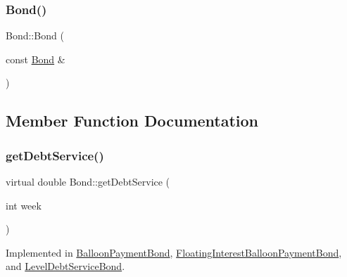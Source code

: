 \mbox{\label{classBond_acaa8874ed5e81057eeb7dc55fb6b5373_acaa8874ed5e81057eeb7dc55fb6b5373}} 
\subsubsection{\texorpdfstring{Bond()}{Bond()}\hspace{0.1cm}{\footnotesize\ttfamily [4/4]}}
{\footnotesize\ttfamily Bond\+::\+Bond (\begin{DoxyParamCaption}\item[{const \mbox{\hyperlink{classBond}{Bond}} \&}]{ }\end{DoxyParamCaption})\hspace{0.3cm}{\ttfamily [default]}}



\subsection{Member Function Documentation}
\mbox{\label{classBond_a98d8ecaf4b36319674ebd220598996bc_a98d8ecaf4b36319674ebd220598996bc}} 
\subsubsection{\texorpdfstring{get\+Debt\+Service()}{getDebtService()}}
{\footnotesize\ttfamily virtual double Bond\+::get\+Debt\+Service (\begin{DoxyParamCaption}\item[{int}]{week }\end{DoxyParamCaption})\hspace{0.3cm}{\ttfamily [pure virtual]}}



Implemented in \mbox{\hyperlink{classBalloonPaymentBond_a8648a2ae688f90a3b2e6689711c22b9d_a8648a2ae688f90a3b2e6689711c22b9d}{Balloon\+Payment\+Bond}}, \mbox{\hyperlink{classFloatingInterestBalloonPaymentBond_a0009a0b12e0ebeb15952561513ddc901_a0009a0b12e0ebeb15952561513ddc901}{Floating\+Interest\+Balloon\+Payment\+Bond}}, and \mbox{\hyperlink{classLevelDebtServiceBond_adcb3bd3c34b0cbb7b013f387ddd8b7f5_adcb3bd3c34b0cbb7b013f387ddd8b7f5}{Level\+Debt\+Service\+Bond}}.

